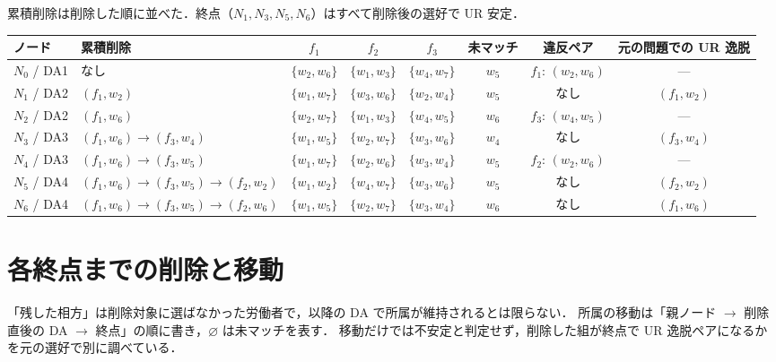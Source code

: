 \documentclass[a4paper,10pt]{ltjsarticle}
\newcommand{\um}{\varnothing}
\begin{document}
累積削除は削除した順に並べた．終点（$N_1, N_3, N_5, N_6$）はすべて削除後の選好で UR 安定．

\begin{center}
\footnotesize\setlength{\tabcolsep}{4pt}
\renewcommand{\arraystretch}{1.25}
\begin{tabular}{@{}llcccccc@{}}
  \toprule
  ノード & 累積削除 & $f_1$ & $f_2$ & $f_3$ & 未マッチ & 違反ペア & 元の問題での UR 逸脱 \\
  \midrule
  $N_0$ / DA1 & なし & $\{w_2,w_6\}$ & $\{w_1,w_3\}$ & $\{w_4,w_7\}$ & $w_5$ & $f_1$: $(w_2,w_6)$ & --- \\
  $N_1$ / DA2 & $(f_1,w_2)$ & $\{w_1,w_7\}$ & $\{w_3,w_6\}$ & $\{w_2,w_4\}$ & $w_5$ & なし & $(f_1,w_2)$ \\
  $N_2$ / DA2 & $(f_1,w_6)$ & $\{w_2,w_7\}$ & $\{w_1,w_3\}$ & $\{w_4,w_5\}$ & $w_6$ & $f_3$: $(w_4,w_5)$ & --- \\
  $N_3$ / DA3 & $(f_1,w_6) \to (f_3,w_4)$ & $\{w_1,w_5\}$ & $\{w_2,w_7\}$ & $\{w_3,w_6\}$ & $w_4$ & なし & $(f_3,w_4)$ \\
  $N_4$ / DA3 & $(f_1,w_6) \to (f_3,w_5)$ & $\{w_1,w_7\}$ & $\{w_2,w_6\}$ & $\{w_3,w_4\}$ & $w_5$ & $f_2$: $(w_2,w_6)$ & --- \\
  $N_5$ / DA4 & $(f_1,w_6) \to (f_3,w_5) \to (f_2,w_2)$ & $\{w_1,w_2\}$ & $\{w_4,w_7\}$ & $\{w_3,w_6\}$ & $w_5$ & なし & $(f_2,w_2)$ \\
  $N_6$ / DA4 & $(f_1,w_6) \to (f_3,w_5) \to (f_2,w_6)$ & $\{w_1,w_5\}$ & $\{w_2,w_7\}$ & $\{w_3,w_4\}$ & $w_6$ & なし & $(f_1,w_6)$ \\
  \bottomrule
\end{tabular}
\end{center}

\section*{各終点までの削除と移動}

「残した相方」は削除対象に選ばなかった労働者で，以降の DA で所属が維持されるとは限らない．
所属の移動は「親ノード $\to$ 削除直後の DA $\to$ 終点」の順に書き，$\um$ は未マッチを表す．
移動だけでは不安定と判定せず，削除した組が終点で UR 逸脱ペアになるかを元の選好で別に調べている．

\newcommand{\pathtable}[1]{%
\begin{center}
\small
\renewcommand{\arraystretch}{1.2}
\begin{tabular}{@{}ccccccc@{}}
  \toprule
  順番 & 選んだ違反 & 削除 & 残した相方 & 削除側の所属 & 相方の所属 & 終点で UR 逸脱 \\
  \midrule
  #1
  \bottomrule
\end{tabular}
\end{center}}
\end{document}
